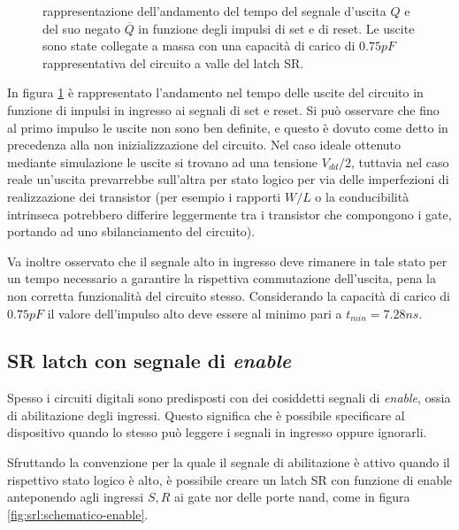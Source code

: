 	\begin{figure}[H]
		\centering
		
		\caption{rappresentazione dell'andamento del tempo del segnale d'uscita $Q$ e del suo negato $\overline Q$ in funzione degli impulsi di set e di reset. Le uscite sono state collegate a massa con una capacità di carico di $0.75pF$ rappresentativa del circuito a valle del latch SR.}
		\label{fig:srl:transitorio}
	\end{figure}

	In figura \ref{fig:srl:transitorio} è rappresentato l'andamento nel tempo delle uscite del circuito in funzione di impulsi in ingresso ai segnali di set e reset. Si può osservare che fino al primo impulso le uscite non sono ben definite, e questo è dovuto come detto in precedenza alla non inizializzazione del circuito. Nel caso ideale ottenuto mediante simulazione le uscite si trovano ad una tensione $V_{dd}/2$, tuttavia nel caso reale un'uscita prevarrebbe sull'altra per stato logico per via delle imperfezioni di realizzazione dei transistor (per esempio i rapporti $W/L$ o la conducibilità intrinseca potrebbero differire leggermente tra i transistor che compongono i gate, portando ad uno sbilanciamento del circuito).
	
	Va inoltre osservato che il segnale alto in ingresso deve rimanere in tale stato per un tempo necessario a garantire la rispettiva commutazione dell'uscita, pena la non corretta funzionalità del circuito stesso. Considerando la capacità di carico di $0.75pF$ il valore dell'impulso alto deve essere al minimo pari a $t_{min} = 7.28ns$. 

\subsection*{SR latch con segnale di \textit{enable}}
	Spesso i circuiti digitali sono predisposti con dei cosiddetti segnali di \textit{enable}, ossia di abilitazione degli ingressi. Questo significa che è possibile specificare al dispositivo quando lo stesso può leggere i segnali in ingresso oppure ignorarli.
	
	Sfruttando la convenzione per la quale il segnale di abilitazione è attivo quando il rispettivo stato logico è alto, è possibile creare un latch SR con funzione di enable anteponendo agli ingressi $S,R$ ai gate nor delle porte nand, come in figura \ref{fig:srl:schematico-enable}.
	
